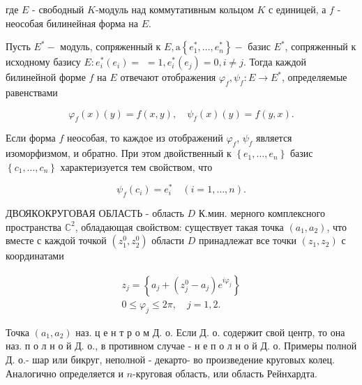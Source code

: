 \documentclass[10pt]{article}
\begin{document}
где $E$ - свободный $K$-модуль над коммутативным кольцом $K$ с единицей, а $f$ - неособая билинейная форма на $E$.



Пусть $E^{*}-$ модуль, сопряженный к $E, \mathrm{a}\left\{e_{1}^{*}, \ldots, e_{n}^{*}\right\}-$ базис $E^{*}$, сопряженный к исходному базису $E: e_{i}^{*}\left(e_{i}\right)=$ $=1, e_{i}^{*}\left(e_{j}\right)=0, i \neq j$. Тогда каждой билинейной форме $f$ на $E$ отвечают отображения $\varphi_{f}, \psi_{f}: E \rightarrow E^{*}$, определяемые равенствами



\[

\varphi_{f}(x)(y)=f(x, y), \quad \psi_{f}(x)(y)=f(y, x) .

\]



Если форма $f$ неособая, то каждое из отображений $\varphi_{f}$, $\psi_{f}$ является изоморфизмом, и обратно. При этом двойственный к $\left\{e_{1}, \ldots, e_{n}\right\}$ базис $\left\{c_{1}, \ldots, c_{n}\right\}$ характеризуется тем свойством, что



\[

\psi_{f}\left(c_{i}\right)=e_{i}^{*} \quad(i=1, \ldots, n) .

\]



ДВОЯКОКРУГОВАЯ ОБЛАСТЬ - область $D$ К.мин. мерного комплексного пространства $\mathbb{C}^{2}$, обладающая свойством: существует такая точка $\left(a_{1}, a_{2}\right)$, что вместе с каждой точкой $\left(z_{1}^{0}, z_{2}^{0}\right)$ области $D$ принадлежат все точки $\left(z_{1}, z_{2}\right)$ с координатами



\[

\begin{gathered}

z_{j}=\left\{a_{j}+\left(z_{j}^{0}-a_{j}\right) e^{i \varphi_{j}}\right\} \\

0 \leqslant \varphi_{j} \leqslant 2 \pi, \quad j=1,2 .

\end{gathered}

\]



Точка $\left(a_{1}, a_{2}\right)$ наз. ц е н т р о м Д. о. Если Д. о. содержит свой центр, то она наз. п о л н о й Д. о., в противном случае - н е п о л н о й Д. о. Примеры полной Д. о.- шар или бикруг, неполной - декарто- во произведение круговых колец. Аналогично определяется и $n$-круговая область, или область Рейнхардта.
\end{document}

